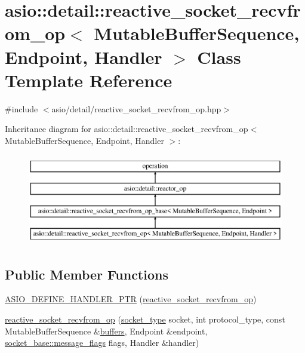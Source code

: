 \hypertarget{classasio_1_1detail_1_1reactive__socket__recvfrom__op}{}\section{asio\+:\+:detail\+:\+:reactive\+\_\+socket\+\_\+recvfrom\+\_\+op$<$ Mutable\+Buffer\+Sequence, Endpoint, Handler $>$ Class Template Reference}
\label{classasio_1_1detail_1_1reactive__socket__recvfrom__op}


{\ttfamily \#include $<$asio/detail/reactive\+\_\+socket\+\_\+recvfrom\+\_\+op.\+hpp$>$}

Inheritance diagram for asio\+:\+:detail\+:\+:reactive\+\_\+socket\+\_\+recvfrom\+\_\+op$<$ Mutable\+Buffer\+Sequence, Endpoint, Handler $>$\+:\begin{figure}[H]
\begin{center}
\leavevmode
\includegraphics[height=4.000000cm]{classasio_1_1detail_1_1reactive__socket__recvfrom__op}
\end{center}
\end{figure}
\subsection*{Public Member Functions}
\begin{DoxyCompactItemize}
\item 
\hyperlink{classasio_1_1detail_1_1reactive__socket__recvfrom__op_aa4fe6eb87d8184419860c57650ecad16}{A\+S\+I\+O\+\_\+\+D\+E\+F\+I\+N\+E\+\_\+\+H\+A\+N\+D\+L\+E\+R\+\_\+\+P\+T\+R} (\hyperlink{classasio_1_1detail_1_1reactive__socket__recvfrom__op}{reactive\+\_\+socket\+\_\+recvfrom\+\_\+op})
\item 
\hyperlink{classasio_1_1detail_1_1reactive__socket__recvfrom__op_acd0c9e80cc507f518ed9bde6b8552aac}{reactive\+\_\+socket\+\_\+recvfrom\+\_\+op} (\hyperlink{namespaceasio_1_1detail_a6798c771dd84b79798b1a08150706ea9}{socket\+\_\+type} socket, int protocol\+\_\+type, const Mutable\+Buffer\+Sequence \&\hyperlink{group__async__read_ga54dede45c3175148a77fe6635222c47d}{buffers}, Endpoint \&endpoint, \hyperlink{classasio_1_1socket__base_ac3cf77465dfedfe1979b5415cf32cc94}{socket\+\_\+base\+::message\+\_\+flags} flags, Handler \&handler)
\end{DoxyCompactItemize}
